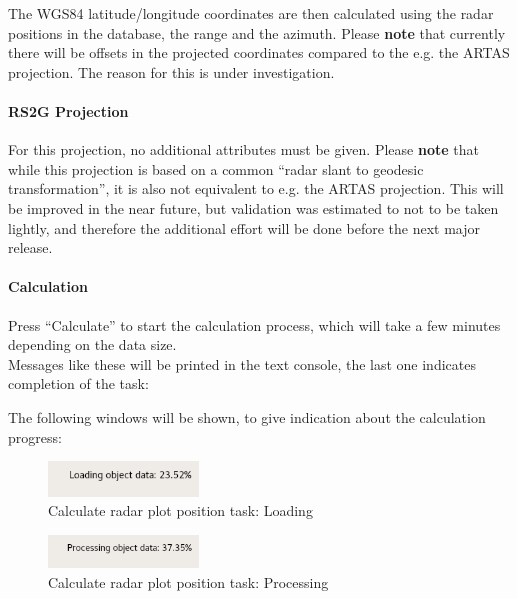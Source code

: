 The WGS84 latitude/longitude coordinates are then calculated using the radar positions in the database, the range and the azimuth. Please \textbf{note} that currently there will be offsets in the projected coordinates compared to the e.g. the ARTAS projection. The reason for this is under investigation.

\paragraph{RS2G Projection}

For this projection, no additional attributes must be given. Please \textbf{note} that while this projection is based on a common ``radar slant to geodesic transformation'', it is also not equivalent to e.g. the ARTAS projection. This will be improved in the near future, but validation was estimated to not to be taken lightly, and therefore the additional effort will be done before the next major release.

\paragraph{Calculation}

Press ``Calculate'' to start the calculation process, which will take a few minutes depending on the data size. \\

Messages like these will be printed in the text console, the last one indicates completion of the task:

The following windows will be shown, to give indication about the calculation progress:

\begin{figure}[H]
  \center
    \includegraphics[width=4cm,frame]{../screenshots/task_calc_radar_load.png}
  \caption{Calculate radar plot position task: Loading}
\end{figure}

\begin{figure}[H]
  \center
    \includegraphics[width=4cm,frame]{../screenshots/task_calc_radar_process.png}
  \caption{Calculate radar plot position task: Processing}
\end{figure}


